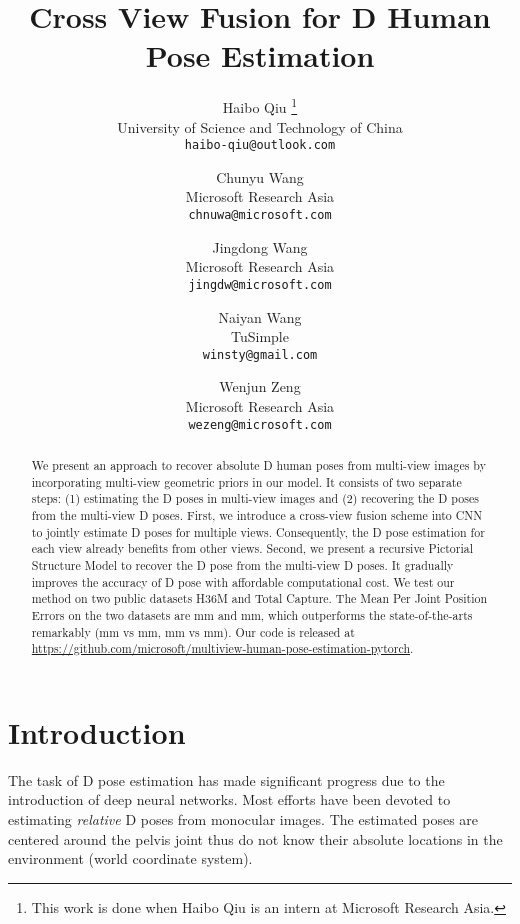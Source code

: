 \documentclass[10pt,twocolumn,letterpaper]{article}
\begin{document}
\title{Cross View Fusion for D Human Pose Estimation}

\author{Haibo Qiu \thanks{This work is done when Haibo Qiu is an intern at Microsoft Research Asia.}\\
University of Science and Technology of China\\
{\tt\small haibo-qiu@outlook.com}
\and
Chunyu Wang\\
Microsoft Research Asia\\
{\tt\small chnuwa@microsoft.com}
\and
Jingdong Wang\\
Microsoft Research Asia\\
{\tt\small jingdw@microsoft.com}
\and
Naiyan Wang\\
TuSimple\\
{\tt\small winsty@gmail.com}
\and
Wenjun Zeng\\
Microsoft Research Asia\\
{\tt\small wezeng@microsoft.com}
}

\maketitle



\begin{abstract}
We present an approach to recover absolute D human poses from multi-view images by incorporating multi-view geometric priors in our model. It consists of two separate steps: (1) estimating the D poses in multi-view images and (2) recovering the D poses from the multi-view D poses.
First,
we introduce a cross-view fusion scheme into CNN to jointly estimate D poses for multiple views.
Consequently, the D pose estimation for each view already benefits from other views.
Second,
we present a recursive Pictorial Structure Model to recover the D pose from the multi-view D poses.
It gradually improves the accuracy of D pose with affordable computational cost.
We test our method on two public datasets H36M and Total Capture. The Mean Per Joint Position Errors on the two datasets are mm and mm, which outperforms the state-of-the-arts remarkably (mm vs mm, mm vs mm). Our code is released at \url{https://github.com/microsoft/multiview-human-pose-estimation-pytorch}.
\end{abstract}



\section{Introduction}
The task of D pose estimation has made significant progress due to the introduction of deep neural networks. Most efforts \cite{martinez2017simple, kanazawa2018end,zhou2017towards,pavlakos2017coarse,tome2017lifting,Rhodin_2018_ECCV,wang2014robust,wang2018robust,lcn2019} have been devoted to estimating \textit{relative} D poses from monocular images. The estimated poses are centered around the pelvis joint thus do not know their absolute locations in the environment (world coordinate system).
\end{document}
